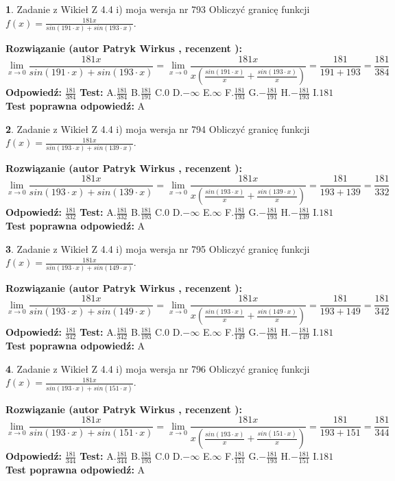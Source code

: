 \documentclass[12pt, a4paper]{article}
\theoremstyle{definition} %
\newtheorem{zad}{}
\newcommand{\zadStart}[1]{\begin{zad}#1\newline}
\newcommand{\zadStop}{\end{zad}}
\newcommand{\rozwStart}[2]{\noindent \textbf{Rozwiązanie (autor #1 , recenzent #2): }\newline}
\newcommand{\rozwStop}{\newline}
\newcommand{\odpStart}{\noindent \textbf{Odpowiedź:}\newline}
\newcommand{\odpStop}{\newline}
\newcommand{\testStart}{\noindent \textbf{Test:}\newline}
\newcommand{\testStop}{\newline}
\newcommand{\kluczStart}{\noindent \textbf{Test poprawna odpowiedź:}\newline}
\newcommand{\kluczStop}{\newline}
\begin{document}
\zadStart{Zadanie z Wikieł Z 4.4 i) moja wersja nr 793}
Obliczyć granicę funkcji $f(x)=\frac{181x}{sin(191\cdot x) +sin(193\cdot x)}$.
\zadStop
\rozwStart{Patryk Wirkus}{}
$$\lim\limits_{x\to 0}\frac{181x}{sin(191\cdot x) +sin(193\cdot x)}=\lim\limits_{x\to 0}\frac{181x}{x(\frac{sin(191\cdot x)}{x}+\frac{sin(193\cdot x)}{x})}=\frac{181}{191+193} = \frac{181}{384}$$
\rozwStop
\odpStart
$\frac{181}{384}$
\odpStop
\testStart
A.$\frac{181}{384}$
B.$\frac{181}{191}$
C.$0$
D.$-\infty$
E.$\infty$
F.$\frac{181}{193}$
G.$-\frac{181}{191}$
H.$-\frac{181}{193}$
I.$181$
\testStop
\kluczStart
A
\kluczStop



\zadStart{Zadanie z Wikieł Z 4.4 i) moja wersja nr 794}
Obliczyć granicę funkcji $f(x)=\frac{181x}{sin(193\cdot x) +sin(139\cdot x)}$.
\zadStop
\rozwStart{Patryk Wirkus}{}
$$\lim\limits_{x\to 0}\frac{181x}{sin(193\cdot x) +sin(139\cdot x)}=\lim\limits_{x\to 0}\frac{181x}{x(\frac{sin(193\cdot x)}{x}+\frac{sin(139\cdot x)}{x})}=\frac{181}{193+139} = \frac{181}{332}$$
\rozwStop
\odpStart
$\frac{181}{332}$
\odpStop
\testStart
A.$\frac{181}{332}$
B.$\frac{181}{193}$
C.$0$
D.$-\infty$
E.$\infty$
F.$\frac{181}{139}$
G.$-\frac{181}{193}$
H.$-\frac{181}{139}$
I.$181$
\testStop
\kluczStart
A
\kluczStop



\zadStart{Zadanie z Wikieł Z 4.4 i) moja wersja nr 795}
Obliczyć granicę funkcji $f(x)=\frac{181x}{sin(193\cdot x) +sin(149\cdot x)}$.
\zadStop
\rozwStart{Patryk Wirkus}{}
$$\lim\limits_{x\to 0}\frac{181x}{sin(193\cdot x) +sin(149\cdot x)}=\lim\limits_{x\to 0}\frac{181x}{x(\frac{sin(193\cdot x)}{x}+\frac{sin(149\cdot x)}{x})}=\frac{181}{193+149} = \frac{181}{342}$$
\rozwStop
\odpStart
$\frac{181}{342}$
\odpStop
\testStart
A.$\frac{181}{342}$
B.$\frac{181}{193}$
C.$0$
D.$-\infty$
E.$\infty$
F.$\frac{181}{149}$
G.$-\frac{181}{193}$
H.$-\frac{181}{149}$
I.$181$
\testStop
\kluczStart
A
\kluczStop



\zadStart{Zadanie z Wikieł Z 4.4 i) moja wersja nr 796}
Obliczyć granicę funkcji $f(x)=\frac{181x}{sin(193\cdot x) +sin(151\cdot x)}$.
\zadStop
\rozwStart{Patryk Wirkus}{}
$$\lim\limits_{x\to 0}\frac{181x}{sin(193\cdot x) +sin(151\cdot x)}=\lim\limits_{x\to 0}\frac{181x}{x(\frac{sin(193\cdot x)}{x}+\frac{sin(151\cdot x)}{x})}=\frac{181}{193+151} = \frac{181}{344}$$
\rozwStop
\odpStart
$\frac{181}{344}$
\odpStop
\testStart
A.$\frac{181}{344}$
B.$\frac{181}{193}$
C.$0$
D.$-\infty$
E.$\infty$
F.$\frac{181}{151}$
G.$-\frac{181}{193}$
H.$-\frac{181}{151}$
I.$181$
\testStop
\kluczStart
A
\kluczStop
\end{document}
